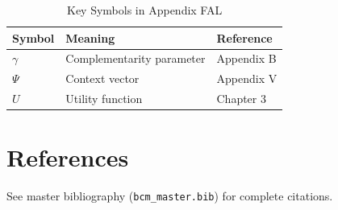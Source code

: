 \begin{table}[htbp]
\centering
\caption{Key Symbols in Appendix FAL}
\begin{tabular}{lll}
\toprule
\textbf{Symbol} & \textbf{Meaning} & \textbf{Reference} \\
\midrule
$\gamma$ & Complementarity parameter & Appendix B \\
$\Psi$ & Context vector & Appendix V \\
$U$ & Utility function & Chapter 3 \\
\bottomrule
\end{tabular}
\end{table}


\section{References}
\label{sec:fal-references}

See master bibliography (\texttt{bcm\_master.bib}) for complete citations.

\nocite{bcm_master}

